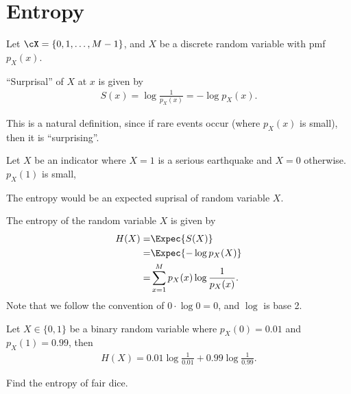 \documentclass{article}
\begin{document}
\newpage
\setcounter{section}{0}
\setcounter{theorem}{0}
\setcounter{equation}{0}


\section{Entropy}
Let $\cX= \{0, 1, \dots, M-1\}$, and $X$ be a discrete random variable with pmf $p_X(x)$. 

\begin{definition}
    ``Surprisal'' of $X$ at $x$ is given by
    \begin{align}
        S(x) = \log \frac{1}{p_X(x)} = -\log p_X(x).
    \end{align}
\end{definition}
This is a natural definition, since if rare events occur (where $p_X(x)$ is small), then it is ``surprising''.

\begin{example}
    Let $X$ be an indicator where $X=1$ is a serious earthquake and $X=0$ otherwise.   
    $p_X(1)$ is small,
\end{example}


The entropy would be an expected suprisal of random variable $X$.
\begin{definition}
    The entropy of the random variable $X$ is given by \begin{align}
        H(X) =& \Expec{S(X)}\\
        =& \Expec{-\log p_X(X)}\\
        =& \sum_{x=1}^M p_X(x) \log \frac{1}{p_X(x)}.
    \end{align}
    Note that we follow the convention of $0\cdot \log 0 = 0$, and $\log$ is base 2.
\end{definition}

\begin{example}
    Let $X\in\{0, 1\}$ be a binary random variable where $p_X(0) = 0.01$ and $p_X(1) = 0.99$, then
    \begin{align}
        H(X) = 0.01 \log \frac{1}{0.01} + 0.99 \log \frac{1}{0.99}.
    \end{align}
\end{example}

\begin{exercise}
    Find the entropy of fair dice.
\end{exercise}
\end{document}
